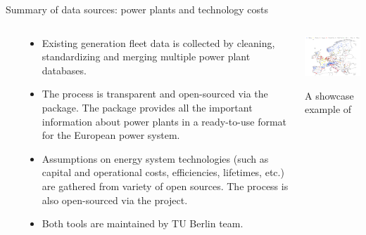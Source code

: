 \begin{frame}{Summary of data sources: power plants and technology costs}
 
  \begin{columns}[T]\

  \begin{column}{7.5cm}
    {\small 
    \begin{itemize}
      \item Existing generation fleet data is collected by cleaning, 
      standardizing and merging multiple power plant databases.
      
      \item The process is transparent and open-sourced via the 
       package.
      The package provides all the important information about power plants in a ready-to-use format
      for the European power system. 
  
      \item Assumptions on energy system technologies (such as capital and operational costs, efficiencies, lifetimes, etc.) 
      are gathered from variety of open sources. The process is also open-sourced via the 
       project. 
  
      \item Both tools are maintained by TU Berlin team.
  
    \end{itemize}
    }  
  \end{column}

  \begin{column}{7cm}

  \vspace{0.3cm}
  \centering

  \includegraphics[width=7cm]{images/powerplantmatching.png}

  {\footnotesize 
  \vspace{0.1cm}
  A showcase example 
  of 
  }
  \end{column}
  \end{columns}

\end{frame}



